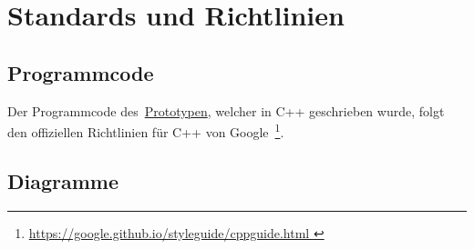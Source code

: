 % 
% 
% 

\section{Standards und Richtlinien}
\label{sec:standards_guidelines}

\subsection{Programmcode}
\label{subsec:standards_guidelines:code}

Der Programmcode des~\hyperref[chap:prototype]{Prototypen}, welcher in C++ geschrieben wurde, folgt
den offiziellen Richtlinien für C++ von Google~\footnote{
    \href{https://google.github.io/styleguide/cppguide.html}{
        https://google.github.io/styleguide/cppguide.html
    }
}.

\subsection{Diagramme}
\label{subsec:standards_guidelines:diagrams}

